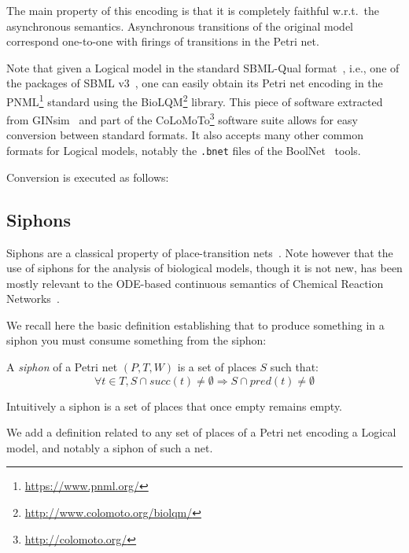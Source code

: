 \documentclass[runningheads]{llncs}
\begin{document}
The main property of this encoding is that it is completely faithful w.r.t.\ the asynchronous semantics.
Asynchronous transitions of the original model correspond one-to-one with firings of transitions in the Petri net.


Note that given a Logical model in the standard SBML-Qual format~\cite{chaouiya2013sbml}, i.e., one of the packages of SBML v3~\cite{keating2020sbml}, one can easily obtain its Petri net encoding in the PNML\footnote{\url{https://www.pnml.org/}} standard using the BioLQM\footnote{\url{http://www.colomoto.org/biolqm/}} library.
This piece of software extracted from GINsim~\cite{chaouiya2012logical} and part of the CoLoMoTo\footnote{\url{http://colomoto.org/}} software suite allows for easy conversion between standard formats.
It also accepts many other common formats for Logical models, notably the \verb|.bnet| files of the  BoolNet~\cite{mussel2010boolnet,klarner2017pyboolnet} tools.

Conversion is executed as follows:


\subsection{Siphons}

Siphons are a classical property of place-transition nets~\cite{peterson1981petri}.
Note however that the use of siphons for the analysis of biological models, though it is not new, has been mostly relevant to the ODE-based continuous semantics of Chemical Reaction Networks~\cite{angeli2007petri,angeli2011persistence,degrand2020graphical}.

We recall here the basic definition establishing that to produce something in a siphon you must consume something from the siphon:

\begin{definition}

  A \emph{siphon} of a Petri net \((P, T, W)\) is a set of places \(S\) such that:
  \[\forall t\in T, S\cap succ(t)\not =\emptyset\Rightarrow S\cap pred(t)\not =\emptyset\]

\end{definition}

Intuitively a siphon is a set of places that once empty remains empty.

We add a definition related to any set of places of a Petri net encoding a Logical model, and notably a siphon of such a net.
\end{document}
